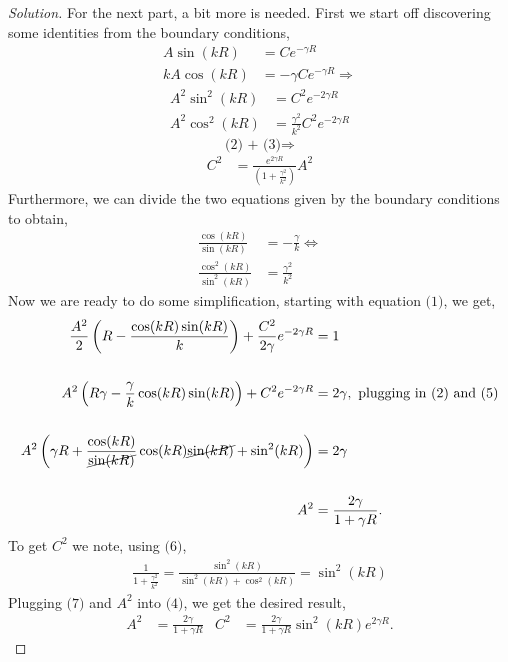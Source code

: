 \documentclass[12pt]{article}
\renewcommand{\=}[1]{\stackrel{#1}{=}} %
\newenvironment{solution}{\begin{proof}[Solution]}{\end{proof}}
\begin{document}
\begin{solution}
    	\noindent For the next part, a bit more is needed. First we start off discovering some identities from the boundary conditions,
    	\begin{align*}
    	    A\sin(kR) &= Ce^{-\gamma R}\\
    	    kA\cos(kR) &= -\gamma Ce^{-\gamma R} \Rightarrow
    	\end{align*}
    	\begin{align}
    	    A^2 \sin^2(kR) &= C^2 e^{-2\gamma R}\\
    	    A^2 \cos^2(kR) &= \frac{\gamma^2}{k^2}C^2e^{-2\gamma R}
    	\end{align}
    	$$
    	\text{(2) + (3)} \Rightarrow
    	$$
    	\begin{align}
    	    C^2 &= \frac{e^{2\gamma R}}{\left(1 + \frac{\gamma^2}{k^2}\right)} A^2
    	\end{align}
    	Furthermore, we can divide the two equations given by the boundary conditions to obtain,
    	\begin{align}
    	    \frac{\cos(kR)}{\sin(kR)} &= -\frac{\gamma}{k} \Longleftrightarrow\\
    	    \frac{\cos^2(kR)}{\sin^2(kR)} &= \frac{\gamma^2}{k^2}
    	\end{align}
        Now we are ready to do some simplification, starting with equation $\text{(1)}$, we get,
        \begin{align*}
    	    \frac{A^2}{2}\left(R - \frac{\cos(kR)\sin(kR)}{k}\right) + \frac{C^2}{2\gamma}e^{-2\gamma R} &= 1 \\\\
    	    A^2\left(R\gamma - \frac{\gamma}{k}\cos(kR)\sin(kR)\right) + C^2e^{-2\gamma R} &= 2\gamma, \text{ plugging in (2) and (5)}\\\\
    	    A^2 \left( \gamma R + \frac{\cos(kR)}{\cancel{\sin(kR)}}\cos(kR)\cancel{\sin(kR)} + \sin^2(kR)\right) &= 2\gamma \\\\
    	    A^2 &= \frac{2\gamma}{1 + \gamma R}.
        \end{align*}
        To get $C^2$ we note, using $\text{(6)}$,
        \begin{align}
            \frac{1}{1 + \frac{\gamma^2}{k^2}} = \frac{\sin^2(kR)}{\sin^2(kR) + \cos^2(kR)} = \sin^2(kR) 
        \end{align}
        Plugging $\text{(7)}$ and $A^2$ into $\text{(4)}$, we get the desired result,
        \begin{align*}
            A^2 &= \frac{2\gamma}{1 + \gamma R} & C^2 &= \frac{2\gamma}{1 + \gamma R} \sin^2(kR)e^{2\gamma R}.
        \end{align*}
    \end{solution}
    \pagebreak
\end{document}
